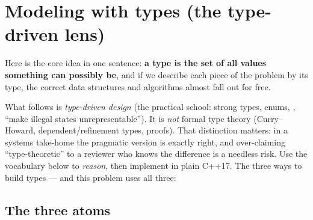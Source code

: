 \section{Modeling with types (the type-driven lens)}

Here is the core idea in one sentence: \textbf{a type is the set of all values
something can possibly be}, and if we describe each piece of the problem by its
type, the correct data structures and algorithms almost fall out for free.

\begin{keybox}
What follows is \emph{type-driven design} (the practical school: strong types,
enums, , ``make illegal states unrepresentable''). It is
\emph{not} formal type theory (Curry--Howard, dependent/refinement types, proofs).
That distinction matters: in a systems take-home the pragmatic version is exactly
right, and over-claiming ``type-theoretic'' to a reviewer who knows the difference
is a needless risk. Use the vocabulary below to \emph{reason}, then implement in
plain C++17. The three ways to build types --- and this problem uses all three:
\end{keybox}

\subsection{The three atoms}

\begin{center}
\end{center}

